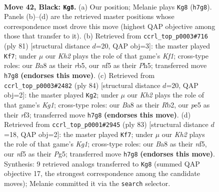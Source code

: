 \documentclass[11pt]{article}
\begin{document}
\clearpage

\begin{figure}[p]\centering
\begin{subfigure}{0.46\textwidth}\centering
\resizebox{\linewidth}{!}{%
\newchessgame
\chessboard[
  setfen={b7/P4p1k/8/4PN1K/5p1P/R7/1r6/8 b - - 0 42},
  showmover=false,
  pgfstyle=straightmove, color=movearrow, markmove={h7-g8}
]}
\caption{}
\end{subfigure}\hfill
\begin{subfigure}{0.46\textwidth}\centering
\resizebox{\linewidth}{!}{%
\newchessgame
\chessboard[
  setfen={5k2/8/6p1/1R2P2p/r7/6KP/6P1/8 b - - 1 41},
  showmover=false,
  pgfstyle=straightmove, color=movearrow, markmove={f8-f7}
]}
\caption{}
\end{subfigure}
\\[4pt]
\begin{subfigure}{0.46\textwidth}\centering
\resizebox{\linewidth}{!}{%
\newchessgame
\chessboard[
  setfen={8/7p/6pk/1B6/1B4nP/5rn1/1R6/6K1 w - - 0 43},
  showmover=false,
  pgfstyle=straightmove, color=movearrow, markmove={g1-g2}
]}
\caption{}
\end{subfigure}\hfill
\begin{subfigure}{0.46\textwidth}\centering
\resizebox{\linewidth}{!}{%
\newchessgame
\chessboard[
  setfen={6k1/7p/2R5/5Npb/1r6/6P1/5KP1/8 b - - 0 42},
  showmover=false,
  pgfstyle=straightmove, color=movearrow, markmove={g8-f7}
]}
\caption{}
\end{subfigure}
\caption{\textbf{Move 42, Black: \texttt{Kg8}.} (a) Our position; Melanie plays \texttt{Kg8} (\texttt{h7g8}). Panels (b)--(d) are the retrieved master positions whose correspondence most drove this move (highest QAP objective among those that transfer to it). (b) Retrieved from \texttt{ccrl\_top\_p0003\#716} (ply 81) [structural distance $d$=20, QAP obj=3]: the master played \texttt{Kf7}; under $\mu$ our \emph{Kh2} plays the role of that game's \emph{Kf1}; cross-type roles: our \emph{B}a8 as their \emph{r}b5, our \emph{n}f5 as their \emph{P}h5; transferred move \texttt{h7g8} \textbf{(endorses this move)}. (c) Retrieved from \texttt{ccrl\_top\_p0003\#2482} (ply 84) [structural distance $d$=20, QAP obj=2]: the master played \texttt{Kg2}; under $\mu$ our \emph{Kh2} plays the role of that game's \emph{Kg1}; cross-type roles: our \emph{B}a8 as their \emph{R}b2, our \emph{p}e5 as their \emph{r}f3; transferred move \texttt{h7g8} \textbf{(endorses this move)}. (d) Retrieved from \texttt{ccrl\_top\_p0001\#2945} (ply 83) [structural distance $d$=18, QAP obj=2]: the master played \texttt{Kf7}; under $\mu$ our \emph{Kh2} plays the role of that game's \emph{Kg1}; cross-type roles: our \emph{B}a8 as their \emph{n}f5, our \emph{n}f5 as their \emph{P}g5; transferred move \texttt{h7g8} \textbf{(endorses this move)}. Synthesis: 9 retrieved analogs transferred to \texttt{Kg8} (summed QAP objective 17, the strongest correspondence among the candidate moves); Melanie committed it via the \texttt{search} selector.}
\label{fig:thought-m83}
\end{figure}
\end{document}
